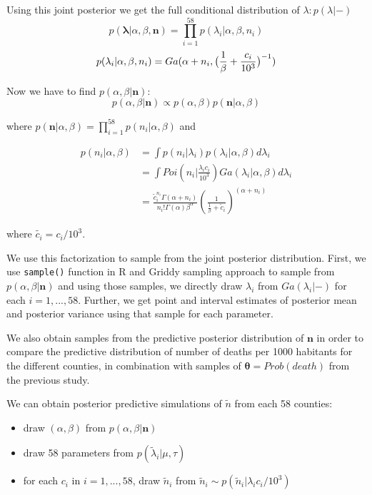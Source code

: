 \documentclass[11pt,twocolumn]{asaproc}
\begin{document}
Using this joint posterior we get the full conditional distribution of $\lambda: p(\lambda|-)$
$$p(\mathbf{\lambda}|\alpha, \beta, \mathbf{n}) = \prod_{i=1}^{58}p(\lambda_i|\alpha, \beta, n_i)$$ 
$$p(\lambda_i|\alpha, \beta, n_i) = Ga(\alpha + n_i, \big{(}\frac{1}{\beta} + \frac{c_i}{10^3}\big{)}^{-1})$$

Now we have to find $p(\alpha, \beta| \mathbf{n})$: 
$$p(\alpha, \beta| \mathbf{n}) \propto p(\alpha, \beta)p(\mathbf{n}|\alpha, \beta)$$

where $p(\mathbf{n}|\alpha, \beta) = \prod_{i=1}^{58}p(n_i|\alpha, \beta)$ and 

\begin{align*}
p(n_i|\alpha, \beta) & = \int p(n_i|\lambda_i)p(\lambda_i|\alpha, \beta) d\lambda_i \\
& = \int Poi(n_i|\frac{\lambda_ic_i }{10^3})Ga(\lambda_i | \alpha, \beta) d\lambda_i \\
& = \frac{\tilde{c}_i^{n_i}\Gamma(\alpha+n_i)}{n_i!\Gamma(\alpha)\beta^{\alpha}} (\frac{1}{\frac{1}{\beta} + \tilde{c}_i})^{(\alpha+n_i)}
\end{align*}

where $\tilde{c_i} = c_i/10^3$.

We use this factorization to sample from the joint posterior distribution. First, we use \texttt{sample()} function in R and Griddy sampling approach to sample from $p(\alpha, \beta | \mathbf{n})$ and using those samples, we directly draw $\lambda_i$ from $Ga(\lambda_i|-)$ for each $i = 1, ..., 58$. Further, we get point and interval estimates of posterior mean and posterior variance using that sample for each parameter.

We also obtain samples from the predictive posterior distribution of $\mathbf{n}$ in order to compare the predictive distribution of number of deaths per 1000 habitants for the different counties, in combination with samples of $\mathbf{\theta} = Prob(death)$ from the previous study. 

We can obtain posterior predictive simulations of $\tilde{n}$ from each 58 counties:

\begin{itemize}
\item draw $(\alpha, \beta)$ from $p(\alpha, \beta | \mathbf{n})$
\item draw 58 parameters from $p(\tilde{\lambda}_i | \mu, \tau)$
\item for each $c_i$ in $i = 1, ..., 58$, draw $\tilde{n}_i$ from $\tilde{n}_i \sim p(\tilde{n}_i | \lambda_ic_i /10^3)$
\end{itemize}
\end{document}
